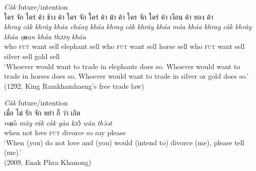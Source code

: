\documentclass[output=paper,colorlinks,citecolor=brown]{langscibook}
\begin{document}
\largerpage[-1]
\newpage

\ea \label{ex:2} \textit{Càk} future/intention\\
\ea \label{ex:2a}
    \textthai{ใคร} \textthai{จัก} \textthai{ใคร่} \textthai{ค้า} \textthai{ช้าง} \textthai{ค้า} \textthai{ใคร} \textthai{จัก} \textthai{ใคร่} \textthai{ค้า} \textthai{ม้า} \textthai{ค้า} \textthai{ใคร} \textthai{จัก} \textthai{ใคร่} \textthai{ค้า} \textthai{เงือน} \textthai{ค้า} \textthai{ทอง} \textthai{ค้า}\\
         \gll \textit{khray} \textit{càk} \textit{khrây} \textit{kháa} \textit{cháaŋ} \textit{kháa} \textit{khray} \textit{càk} \textit{khrây} \textit{kháa} \textit{máa} \textit{kháa} \textit{khray} \textit{càk} \textit{khrây} \textit{kháa} \textit{ŋʉan} \textit{kháa} \textit{thɔɔŋ} \textit{kháa}\\
         who \textsc{fut} want sell elephant sell who \textsc{fut} want sell horse sell who \textsc{fut} want sell silver sell gold sell\\
    \glt ‘Whoever would want to trade in elephants does so. Whoever would want to trade in horses does so. Whoever would want to trade in silver or gold does so.’ \\ \hfill (1292, King Ramkhamhaeng’s free trade law)
    
    \ex \label{ex:2b} \textit{Càk} future/intention\\
    \textthai{เมื่อ} \textthai{ไม่} \textthai{รัก} \textthai{จัก} \textthai{หย่า} \textthai{ก็} \textthai{ว่า} \textthai{เถิด}\\
         \gll \textit{mʉ̂a} \textit{mây} \textit{rák} \textit{càk} \textit{yàa} \textit{kɔ̂ɔ} \textit{wâa} \textit{thə̀ət}\\
         when not love \textsc{fut} divorce so say please\\
    \glt ‘When (you) do not love and (you) would (intend to) divorce (me), please tell (me).’\\
    \hfill (2009, Enak Phra Khanong)
\z
\z
\end{document}
